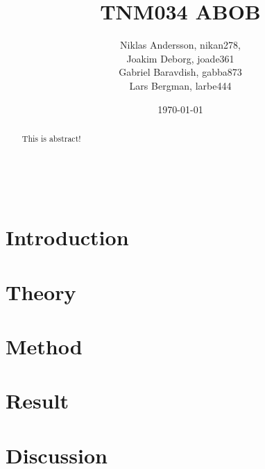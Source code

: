 \documentclass[a4paper, 11pt]{article} %
\title{\textbf{TNM034 ABOB}}
\author{{Niklas Andersson, nikan278},
\\{Joakim Deborg, joade361}
\\{Gabriel Baravdish, gabba873}
\\{Lars Bergman, larbe444}} %
\date{\today} %
\makeatletter
\renewcommand{\maketitle}{ %
\begin{flushright} %
{\LARGE\@title} %

\vspace{50pt} %

{\large\@author} %
\\\@date %

\vspace{40pt} %
\end{flushright}
}
\makeatother
\begin{document}
\maketitle %



\begin{abstract}
This is abstract!

\end{abstract}

\vspace{30pt} %


\newpage

\tableofcontents

\newpage

\section{Introduction}


\section{Theory}


\section{Method}


\section{Result}


\section{Discussion}








\end{document}
